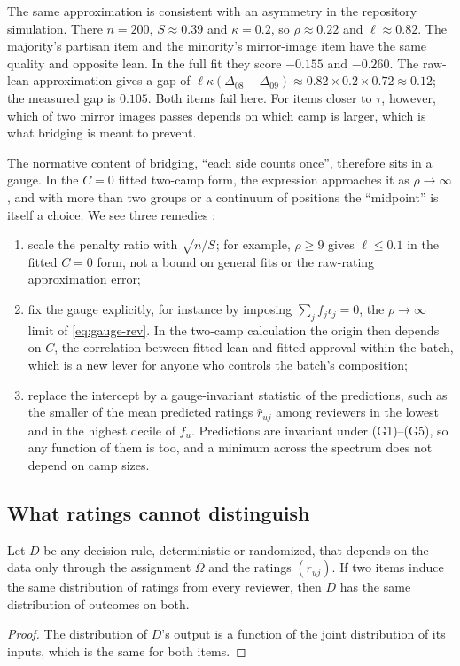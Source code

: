 The same approximation is consistent with an asymmetry in the repository simulation. There $n=200$,
$S\approx0.39$ and $\kappa=0.2$, so $\rho\approx0.22$ and $\ell\approx0.82$. The majority's
partisan item and the minority's mirror-image item have the same quality and opposite lean. In
the full fit they score $-0.155$ and $-0.260$. The raw-lean approximation gives a gap of
$\ell\kappa(\Delta_{08}-\Delta_{09})\approx0.82\times0.2\times0.72\approx0.12$; the measured
gap is $0.105$. Both items fail here. For items closer to $\tau$, however, which of two mirror
images passes depends on which camp is larger, which is what bridging is meant to prevent.

The normative content of bridging, ``each side counts once'', therefore sits in a gauge. In the $C=0$ fitted two-camp form,
the expression approaches it as $\rho\to\infty$, and with more than two groups or a
continuum of positions the ``midpoint'' is itself a choice. We see three remedies
\openq:
\begin{enumerate}[label=(\alph*)]
  \item scale the penalty ratio with $\sqrt{n/S}$; for example, $\rho\ge9$ gives $\ell\le0.1$ in the fitted $C=0$ form,
    not a bound on general fits or the raw-rating approximation error;
  \item fix the gauge explicitly, for instance by imposing $\sum_jf_j\iota_j=0$, the
    $\rho\to\infty$ limit of \eqref{eq:gauge-rev}. In the two-camp calculation the origin then depends on $C$, the
    correlation between fitted lean and fitted approval within the batch, which is a new lever for anyone
    who controls the batch's composition;
  \item replace the intercept by a gauge-invariant statistic of the predictions, such as the
    smaller of the mean predicted ratings $\hat r_{uj}$ among reviewers in the lowest and in the
    highest decile of $f_u$. Predictions are invariant under (G1)--(G5), so any function of
    them is too, and a minimum across the spectrum does not depend on camp sizes.
\end{enumerate}

\subsection{What ratings cannot distinguish}

\begin{proposition}\label{prop:equivalence}\proved{}
Let $D$ be any decision rule, deterministic or randomized, that depends on the data only
through the assignment $\Omega$ and the ratings $(r_{uj})$. If two items induce the same
distribution of ratings from every reviewer, then $D$ has the same distribution of outcomes on
both.
\end{proposition}
\begin{proof}
The distribution of $D$'s output is a function of the joint distribution of its inputs, which is
the same for both items.
\end{proof}

